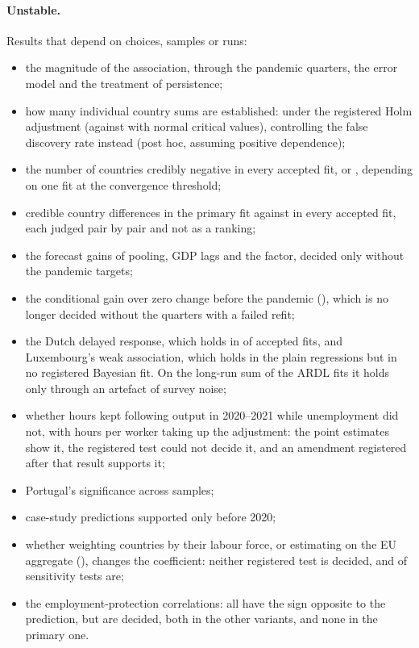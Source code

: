 \paragraph{Unstable.} Results that depend on choices, samples or runs:
\begin{itemize}
  \item the magnitude of the association, through the pandemic quarters, the error model
    and the treatment of persistence;
  \item how many individual country sums are established:  under the
    registered Holm adjustment (against  with normal critical values),
     controlling the false discovery rate instead (post hoc, assuming
    positive dependence);
  \item the number of countries credibly negative in every accepted fit,
     or , depending on one fit at the
    convergence threshold;
  \item {} credible country differences in the primary fit against
     in every accepted fit, each judged pair by pair and not as a
    ranking;
  \item the forecast gains of pooling, GDP lags and the factor, decided only without the
    pandemic targets;
  \item the conditional gain over zero change before the pandemic (),
    which is no longer decided without the quarters with a failed refit;
  \item the Dutch delayed response, which holds in  of
     accepted fits, and Luxembourg's weak association, which holds in
    the plain regressions but in no registered Bayesian fit. On the long-run sum of the
    ARDL fits it holds only through an artefact of survey noise;
  \item whether hours kept following output in 2020--2021 while unemployment did not, with
    hours per worker taking up the adjustment: the point estimates show it, the registered
    test could not decide it, and an amendment registered after that result supports it;
  \item Portugal's significance across samples;
  \item {} case-study predictions supported only before 2020;
  \item whether weighting countries by their labour force, or estimating on the EU
    aggregate (), changes the coefficient: neither registered test is decided,
    and  of  sensitivity tests are;
  \item the employment-protection correlations: all  have the sign
    opposite to the prediction, but  are decided, both in the other
    variants, and none in the primary one.
\end{itemize}

